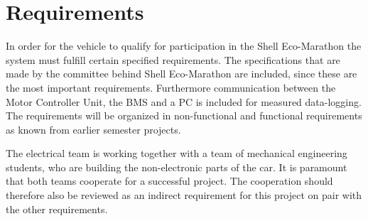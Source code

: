 \chapter{Requirements}
\label{sec:requirements}
In order for the vehicle to qualify for participation in the Shell Eco-Marathon the system must fulfill certain specified requirements. The specifications that are made by the committee behind Shell Eco-Marathon are included, since these are the most important requirements. Furthermore communication between the Motor Controller Unit, the BMS and a PC is included for measured data-logging. The requirements will be organized in non-functional and functional requirements as known from earlier semester projects.

The electrical team is working together with a team of mechanical engineering students, who are building the non-electronic parts of the car. It is paramount that both teams cooperate for a successful project. The cooperation should therefore also be reviewed as an indirect requirement for this project on pair with the other requirements.


\pagebreak

\pagebreak